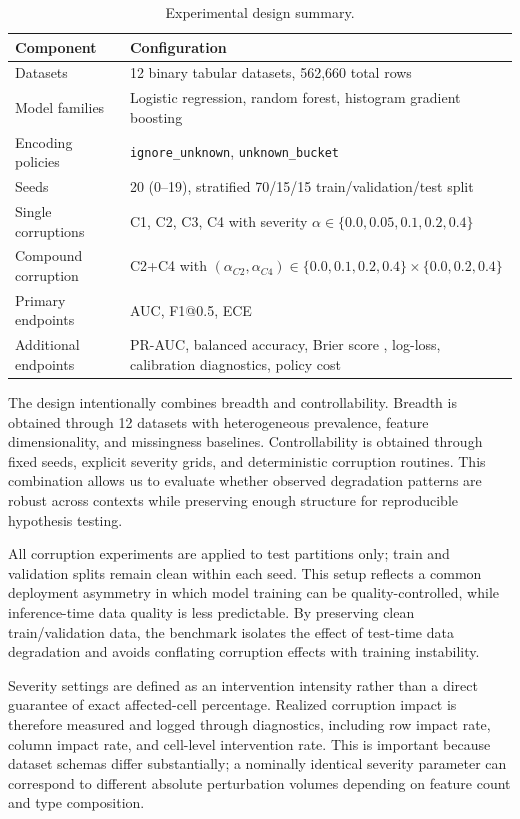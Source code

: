 \documentclass{AuthorGuide/ijitcs}
\begin{document}
\begin{table}[!t]
\caption{Experimental design summary.\label{tab:design}}
\begin{tabularx}{\textwidth}{lX}
\toprule
\textbf{Component} & \textbf{Configuration} \\
\midrule
Datasets & 12 binary tabular datasets, 562,660 total rows \\
Model families & Logistic regression, random forest, histogram gradient boosting \\
Encoding policies & \texttt{ignore\_unknown}, \texttt{unknown\_bucket} \\
Seeds & 20 (0--19), stratified 70/15/15 train/validation/test split \\
Single corruptions & C1, C2, C3, C4 with severity $\alpha\in\{0.0,0.05,0.1,0.2,0.4\}$ \\
Compound corruption & C2+C4 with $(\alpha_{C2},\alpha_{C4})\in\{0.0,0.1,0.2,0.4\}\times\{0.0,0.2,0.4\}$ \\
Primary endpoints & AUC, F1@0.5, ECE \\
Additional endpoints & PR-AUC, balanced accuracy, Brier score \cite{brier1950verification}, log-loss, calibration diagnostics, policy cost \\
\bottomrule
\end{tabularx}
\end{table}

The design intentionally combines breadth and controllability. Breadth is obtained through 12 datasets with heterogeneous prevalence, feature dimensionality, and missingness baselines. Controllability is obtained through fixed seeds, explicit severity grids, and deterministic corruption routines. This combination allows us to evaluate whether observed degradation patterns are robust across contexts while preserving enough structure for reproducible hypothesis testing.

All corruption experiments are applied to test partitions only; train and validation splits remain clean within each seed. This setup reflects a common deployment asymmetry in which model training can be quality-controlled, while inference-time data quality is less predictable. By preserving clean train/validation data, the benchmark isolates the effect of test-time data degradation and avoids conflating corruption effects with training instability.

Severity settings are defined as an intervention intensity rather than a direct guarantee of exact affected-cell percentage. Realized corruption impact is therefore measured and logged through diagnostics, including row impact rate, column impact rate, and cell-level intervention rate. This is important because dataset schemas differ substantially; a nominally identical severity parameter can correspond to different absolute perturbation volumes depending on feature count and type composition.
\end{document}
